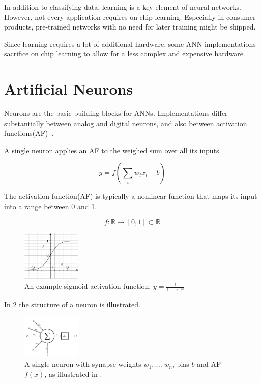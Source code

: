 \documentclass[conference]{IEEEtran}
\begin{document}
    In addition to classifying data, learning is a key element of neural networks.
    However, not every application requires on chip learning.
    Especially in consumer products, pre-trained networks with no need for later training might be shipped.

    Since learning requires a lot of additional hardware, some ANN implementations sacrifice on chip learning to allow for a less complex and expensive hardware.


    \section{Artificial Neurons}

    Neurons are the basic building blocks for ANNs.
    Implementations differ substantially between analog and digital neurons, and also between activation functions(AF)~\cite{habib1989digital}.

    A single neuron applies an AF to the weighed sum over all its inputs.

    \[y = f(\sum_i {w_ix_i} + b)\]

    The activation function(AF) is typically a nonlinear function that maps its input into a range between 0 and 1.

    \[ f: \mathbb{R} \to [0,1] \subset \mathbb{R} \]

    \begin{figure}[h]
        \centering
        \includegraphics[width=0.25\textwidth]{resources/sigmoid.pdf}
        \caption{An example sigmoid activation function. $y = \frac{1}{1+e^{-5x}}$}
        \label{fig:sigmoid}
    \end{figure}

    In \ref{fig:neuron} the structure of a neuron is illustrated.

    \begin{figure}[h]
        \centering
        \includegraphics[width=0.25\textwidth]{resources/neuron.png}
        \caption{A single neuron with synapse weights $w_1,\dots,w_n$, bias $b$ and AF $f(x)$, as illustrated in \cite[Fig.~1]{muthuramalingam2008neural}.}
        \label{fig:neuron}
    \end{figure}
\end{document}

